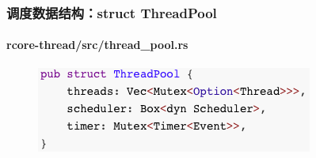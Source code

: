 % 
% 
\begin{frame}[fragile]
    \frametitle{调度数据结构：struct ThreadPool}
    \framesubtitle{rcore-thread/src/thread\_pool.rs}
\begin{figure}
    \includegraphics[width=0.7\linewidth]{figs/ThreadPool.png}
    \end{figure}
\end{frame}
% 
% 
% 
% 
% 

